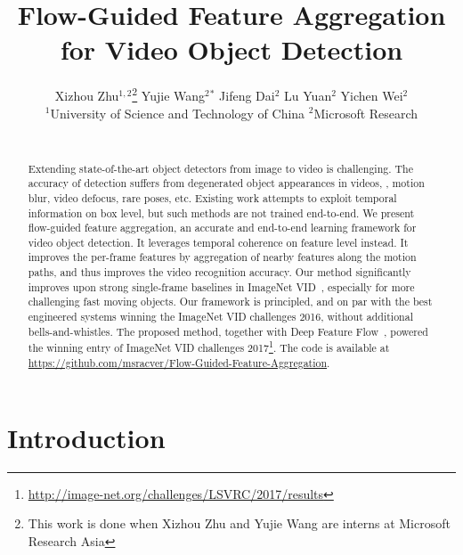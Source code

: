 \documentclass[10pt,twocolumn,letterpaper]{article}
\begin{document}
\title{Flow-Guided Feature Aggregation for Video Object Detection}

\author{Xizhou Zhu$^{1,2}$\thanks{This work is done when Xizhou Zhu and Yujie Wang are interns at Microsoft Research Asia} \qquad Yujie Wang$^{2}$$^{*}$ \qquad Jifeng Dai$^{2}$ \qquad Lu Yuan$^{2}$ \qquad Yichen Wei$^{2}$ \vspace{8pt}\\
	$^{1}$University of Science and Technology of China \qquad\qquad $^{2}$Microsoft Research\qquad\qquad\\
	\hspace{0.7in}{\tt\small ezra0408@mail.ustc.edu.cn} \qquad{} \qquad\\
}



\maketitle


\begin{abstract}  
Extending state-of-the-art object detectors from image to video is challenging. The accuracy of detection suffers from degenerated object appearances in videos, \eg, motion blur, video defocus, rare poses, etc. Existing work attempts to exploit temporal information on box level, but such methods are not trained end-to-end. We present flow-guided feature aggregation, an accurate and end-to-end learning framework for video object detection. It leverages temporal coherence on feature level instead. It improves the per-frame features by aggregation of nearby features along the motion paths, and thus improves the video recognition accuracy. Our method significantly improves upon strong single-frame baselines in ImageNet VID~\cite{russakovsky2015imagenet}, especially for more challenging fast moving objects. Our framework is principled, and on par with the best engineered systems winning the ImageNet VID challenges 2016, without additional bells-and-whistles. The proposed method, together with Deep Feature Flow~\cite{zhu2016dff}, powered the winning entry of ImageNet VID challenges 2017\footnote{\url{http://image-net.org/challenges/LSVRC/2017/results}}. The code is available at \url{https://github.com/msracver/Flow-Guided-Feature-Aggregation}.
\end{abstract}

\section{Introduction}
\end{document}
